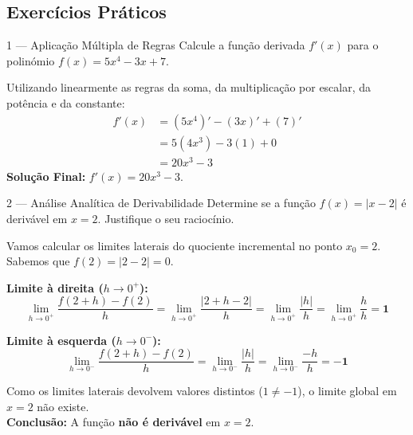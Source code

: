 \subsection{Exercícios Práticos}

\begin{exercisebox}{1 --- Aplicação Múltipla de Regras}
  Calcule a função derivada $f'(x)$ para o polinómio $f(x)=5x^4 - 3x + 7$.
\end{exercisebox}
\begin{solbox}
  Utilizando linearmente as regras da soma, da multiplicação por escalar, da potência e da constante:
  \begin{align*}
      f'(x) &= (5x^4)' - (3x)' + (7)' \\
            &= 5(4x^3) - 3(1) + 0 \\
            &= 20x^3 - 3
  \end{align*}
  \textbf{Solução Final:} $\boxed{f'(x) = 20x^3 - 3}$.
\end{solbox}

\begin{exercisebox}{2 --- Análise Analítica de Derivabilidade}
  Determine se a função $f(x)=|x-2|$ é derivável em $x=2$. Justifique o seu raciocínio.
\end{exercisebox}
\begin{solbox}
  Vamos calcular os limites laterais do quociente incremental no ponto $x_0 = 2$.
  Sabemos que $f(2) = |2-2| = 0$.
  
  \textbf{Limite à direita ($h \to 0^+$):}
  \[
    \lim_{h \to 0^+} \frac{f(2+h) - f(2)}{h} = \lim_{h \to 0^+} \frac{|2+h-2|}{h} = \lim_{h \to 0^+} \frac{|h|}{h} = \lim_{h \to 0^+} \frac{h}{h} = \mathbf{1}
  \]
  
  \textbf{Limite à esquerda ($h \to 0^-$):}
  \[
    \lim_{h \to 0^-} \frac{f(2+h) - f(2)}{h} = \lim_{h \to 0^-} \frac{|h|}{h} = \lim_{h \to 0^-} \frac{-h}{h} = \mathbf{-1}
  \]
  
  Como os limites laterais devolvem valores distintos ($1 \neq -1$), o limite global em $x=2$ não existe. \\
  \textbf{Conclusão:} A função \textbf{não é derivável} em $x=2$.
\end{solbox}

